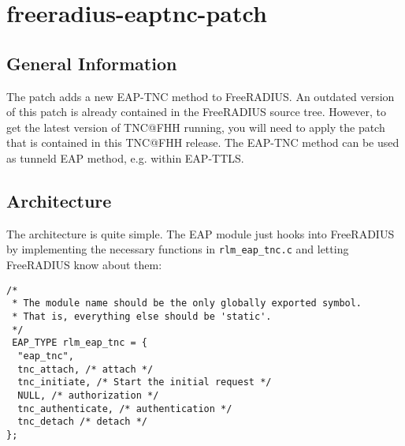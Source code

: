 \documentclass[a4paper,10pt]{scrartcl}
\begin{document}
\section{freeradius-eaptnc-patch}
\subsection{General Information}
The patch adds a new EAP-TNC method to FreeRADIUS. An outdated version of this
patch is already contained in the FreeRADIUS source tree. However, to get the latest
version of TNC@FHH running, you will need to apply the patch that is contained
in this TNC@FHH release. The EAP-TNC method can be used as tunneld EAP method,
e.g. within EAP-TTLS.

\subsection{Architecture}
The architecture is quite simple. The EAP module just hooks into FreeRADIUS by implementing
the necessary functions in \texttt{rlm\_eap\_tnc.c} and letting FreeRADIUS know about them:
\begin{lstlisting}
/*
 * The module name should be the only globally exported symbol.
 * That is, everything else should be 'static'.
 */
 EAP_TYPE rlm_eap_tnc = {
  "eap_tnc",
  tnc_attach, /* attach */
  tnc_initiate, /* Start the initial request */
  NULL, /* authorization */
  tnc_authenticate, /* authentication */
  tnc_detach /* detach */
};
\end{lstlisting}
\end{document}
